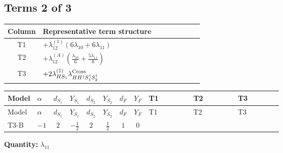 \documentclass[8pt]{article}
\begin{document}
\begin{landscape}
\subsection*{Terms 2 of 3}
\begin{center}
\begin{tabular}{@{}c >{\raggedright\arraybackslash}p{0.82\linewidth}@{}}
\toprule
Column & Representative term structure \\
\midrule
T1 & \(\displaystyle +{\lambda_{12}^{(1)}} (6 {\lambda_{10}}+6 {\lambda_{11}})\) \\
\midrule
T2 & \(\displaystyle +{\lambda_{12}^{(A)}} \left(\frac{{\lambda_{10}}}{6}+\frac{5 {\lambda_{11}}}{6}\right)\) \\
\midrule
T3 & \(\displaystyle +2 {\lambda_{HS_1}^{(1)}} {\lambda_{H H^\dagger S_1^\dagger S_2^\dagger}^{\rm Cross}}\) \\
\midrule
\bottomrule
\end{tabular}
\end{center}
\smallskip
\tiny
\begin{longtable}{@{}llcccccc >{\raggedright\arraybackslash}p{0.21\linewidth} >{\raggedright\arraybackslash}p{0.21\linewidth} >{\raggedright\arraybackslash}p{0.21\linewidth}@{}}
\toprule
Model & $\alpha$ & $d_{S_1}$ & $Y_{S_1}$ & $d_{S_2}$ & $Y_{S_2}$ & $d_F$ & $Y_F$ & T1 & T2 & T3 \\
\midrule
\endfirsthead
\toprule
Model & $\alpha$ & $d_{S_1}$ & $Y_{S_1}$ & $d_{S_2}$ & $Y_{S_2}$ & $d_F$ & $Y_F$ & T1 & T2 & T3 \\
\midrule
\endhead
T3-B & $-1$ & $2$ & $-\frac{1}{2}$ & $2$ & $\frac{1}{2}$ & $1$ & $0$ & \scriptsize\adjustbox{max width=\linewidth}{$\begin{gathered} +{\lambda_{12}^{(1)}} (6 {\lambda_{10}}+6 {\lambda_{11}})\end{gathered}$} & \scriptsize\adjustbox{max width=\linewidth}{$\begin{gathered} +{\lambda_{12}^{(A)}} \left(\frac{{\lambda_{10}}}{6}+\frac{5 {\lambda_{11}}}{6}\right)\end{gathered}$} & \scriptsize\adjustbox{max width=\linewidth}{$\begin{gathered} +2 {\lambda_{HS_1}^{(1)}} {\lambda_{H H^\dagger S_1^\dagger S_2^\dagger}^{\rm Cross}}\end{gathered}$} \\
\midrule
\bottomrule
\end{longtable}
\clearpage
\noindent\textbf{Quantity: }$\lambda_{11}$\par\smallskip

\end{landscape}
\end{document}

